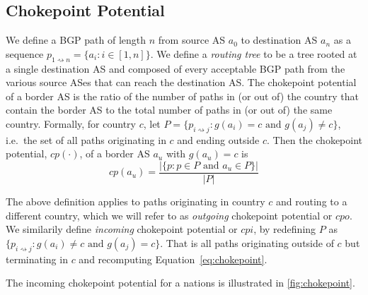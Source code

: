 \subsection{Chokepoint Potential}

We define a BGP path of length $n$ from source AS $a_0$ to destination AS $a_n$
as a sequence $p_{1\rightsquigarrow n} = \{a_i : i \in [1,n]\}$.  We define a
\textit{routing tree} to be a tree rooted at a single destination AS and
composed of every acceptable BGP path from the various source ASes that can
reach the destination AS.  The
chokepoint potential of a border AS is the ratio of the number of paths in (or out of) the country that contain the border AS to
the total number of paths in (or out of) the same country.
Formally, for country $c$, let $P = \{p_{i \rightsquigarrow
j} : g(a_i)=c \text{ and } g(a_j)\neq c\} $, i.e.\ the set of all paths
originating in $c$ and ending outside $c$. Then the chokepoint potential,
$cp(\cdot)$, of a border AS $a_u$ with $g(a_u) = c$ is
\begin{equation}
  \label{eq:chokepoint}
  cp(a_u) = \frac{|\{p: p \in P \text{ and } a_u \in P\}|}{|P|}
\end{equation}


The above definition applies to paths originating in country
$c$ and routing to a different country, which we will refer to as
\textit{outgoing} chokepoint potential or $cpo$. We similarily define
\textit{incoming} chokepoint potential or $cpi$, by redefining $P$ as $\{p_{i
\rightsquigarrow j}: g(a_i) \neq c \text{ and } g(a_j) = c\}$. That is all
paths originating outside of $c$ but terminating in $c$ and recomputing
Equation~\ref{eq:chokepoint}. 

The incoming chokepoint
potential for a nations is illustrated in \figurename
\ref{fig:chokepoint}.

